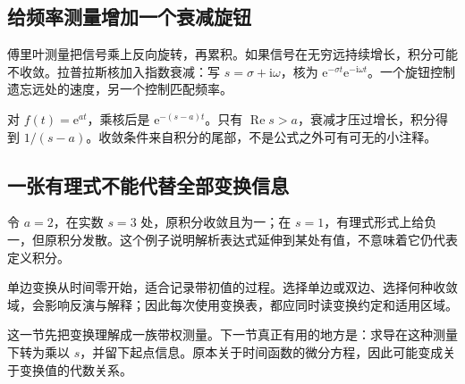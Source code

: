 \subsection*{给频率测量增加一个衰减旋钮}
傅里叶测量把信号乘上反向旋转，再累积。如果信号在无穷远持续增长，积分可能不收敛。拉普拉斯核加入指数衰减：写 $s=\sigma+\mathrm i\omega$，核为 $\mathrm e^{-\sigma t}\mathrm e^{-\mathrm i\omega t}$。一个旋钮控制遗忘远处的速度，另一个控制匹配频率。

对 $f(t)=\mathrm e^{at}$，乘核后是 $\mathrm e^{-(s-a)t}$。只有 $\operatorname{Re}s>a$，衰减才压过增长，积分得到 $1/(s-a)$。收敛条件来自积分的尾部，不是公式之外可有可无的小注释。

\subsection*{一张有理式不能代替全部变换信息}
令 $a=2$，在实数 $s=3$ 处，原积分收敛且为一；在 $s=1$，有理式形式上给负一，但原积分发散。这个例子说明解析表达式延伸到某处有值，不意味着它仍代表定义积分。

单边变换从时间零开始，适合记录带初值的过程。选择单边或双边、选择何种收敛域，会影响反演与解释；因此每次使用变换表，都应同时读变换约定和适用区域。

这一节先把变换理解成一族带权测量。下一节真正有用的地方是：求导在这种测量下转为乘以 $s$，并留下起点信息。原本关于时间函数的微分方程，因此可能变成关于变换值的代数关系。
